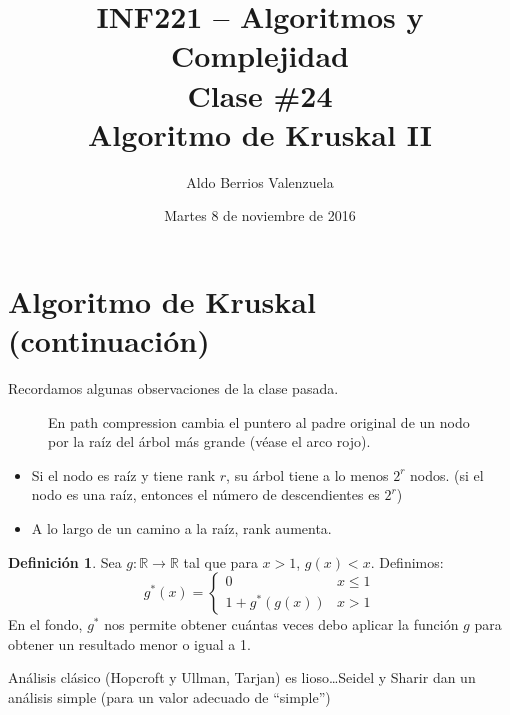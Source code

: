 \documentclass[english, spanish, fleqn, 10pt]{article}
\title{INF221 -- Algoritmos y Complejidad\\[.4\baselineskip]
Clase \#24\\
Algoritmo de Kruskal II}
\date{Martes 8 de noviembre de 2016}
\author{Aldo Berrios Valenzuela}
\newcommand{\comillas}[1]{``#1''}
\numberwithin{equation}{section}
\newcommand{\nparentesis}[1]{\left( #1 \right)}
\theoremstyle{definition}
\newtheorem{definition}{Definición}[section]
\begin{document}
\maketitle

\section{Algoritmo de Kruskal (continuación)}
Recordamos algunas observaciones de la clase pasada.
\begin{figure}[!h]
	\centering
	\caption{En path compression cambia el puntero al padre original de un nodo por la raíz del árbol más grande (véase el arco rojo).}
\end{figure}


\begin{itemize}
	\item Si el nodo es raíz y tiene rank $r$, su árbol tiene a lo menos $2^r$ nodos. (si el nodo es una raíz, entonces el número de descendientes es $2^r$)
	
	\item A lo largo de un camino a la raíz, rank aumenta.
\end{itemize}

\begin{definition}
	Sea $g:\mathbb{R} \rightarrow \mathbb{R}$ tal que para $x > 1$, $g\nparentesis{x} < x$. Definimos:
	\begin{equation}
	g^*\nparentesis{x} = \begin{cases}
	0 & x \leq 1\\
	1 + g^* \nparentesis{g\nparentesis{x}} & x > 1
	\end{cases}
	\end{equation}
	En el fondo, $g^*$ nos permite obtener cuántas veces debo aplicar la función $g$ para obtener un resultado menor o igual a 1.
\end{definition}
Análisis clásico (Hopcroft y Ullman, Tarjan) es lioso\ldots Seidel y Sharir dan un análisis simple (para un valor adecuado de \comillas{simple})
\end{document}
